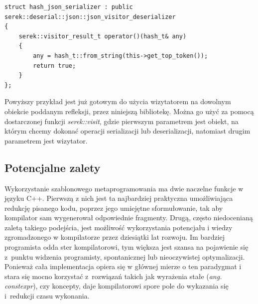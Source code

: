 \documentclass[12pt]{article}
\newcommand{\nonpl}[1]{{\it #1}}
\newcommand{\code}[1]{{\it #1}}
\newcommand{\ang}[1]{\nonpl{ang. #1}}
\begin{document}
{{{				\begin{lstlisting}[frame=single]
struct hash_json_serializer : public serek::deserial::json::json_visitor_deserializer
{
	serek::visitor_result_t operator()(hash_t& any)
	{
		any = hash_t::from_string(this->get_top_token());
		return true;
	}
};
				\end{lstlisting}

				Powyższy przykład jest już gotowym do użycia wizytatorem na dowolnym obiekcie poddanym refleksji, przez niniejszą
				bibliotekę. Można go użyć za pomocą dostarczonej funkcji \code{serek::visit}, gdzie pierwszym parametrem jest obiekt, na którym
				chcemy dokonać operacji serializacji lub deserializacji, natomiast drugim parametrem jest wizytator.
			}
		}

		{
			\subsection{Potencjalne zalety}

			Wykorzystanie szablonowego metaprogramowania\cite{wiki_meta} ma dwie naczelne funkcje w języku C++. Pierwszą z nich jest
			ta najbardziej praktyczna umożliwiająca redukcję pisanego kodu, poprzez jego umiejętne sformułowanie, tak aby kompilator
			sam wygenerował odpowiednie fragmenty. Drugą, często niedocenianą zaletą takiego podejścia, jest możliwość wykorzystania
			potencjału i wiedzy zgromadzonego w kompilatorze przez dziesiątki lat rozwoju. Im bardziej programista odda ster
			kompilatorowi, tym większa jest szansa na pojawienie się z~punktu widzenia programisty, spontanicznej lub nieoczywistej
			optymalizacji. Ponieważ cała implementacja opiera się w głównej mierze o ten paradygmat i stara się mocno korzystać
			z~rozwiązań takich jak wyrażenia stałe (\ang{constexpr}), czy koncepty, daje kompilatorowi spore pole do wykazania się
			i~redukcji czasu wykonania.
		}
	}
\end{document}
